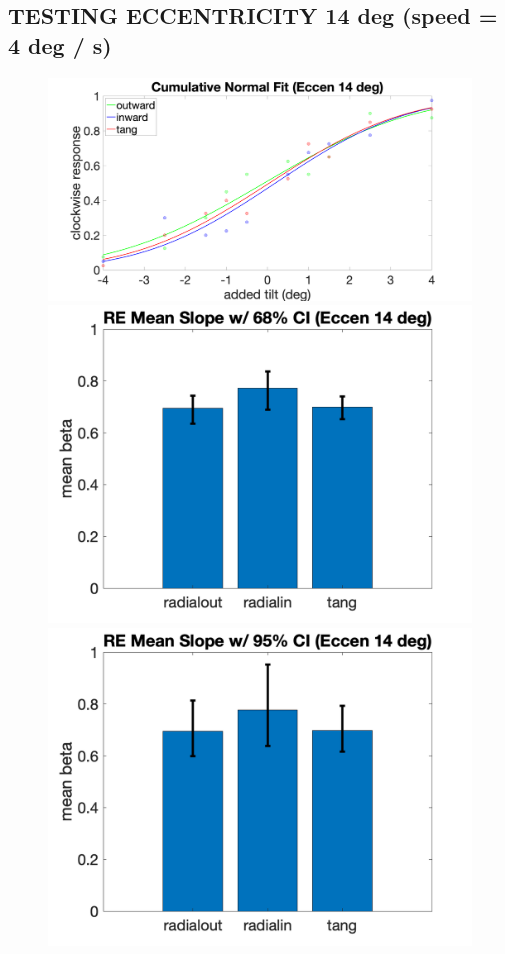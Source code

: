 \documentclass[11pt]{article} %
\begin{document}
\subsection{TESTING ECCENTRICITY 14 deg (speed = 4 deg / s)}
\begin{figure}[H]
\centering %
\includegraphics[scale=.08]{Images/PF_eccen14.png}
\\
\includegraphics[scale=.2]{Images/MeanSlopeError_68ci_RE_eccen14.png}
\includegraphics[scale=.2]{Images/MeanSlopeError_95ci_RE_eccen14.png}

\end{figure}
\end{document}
